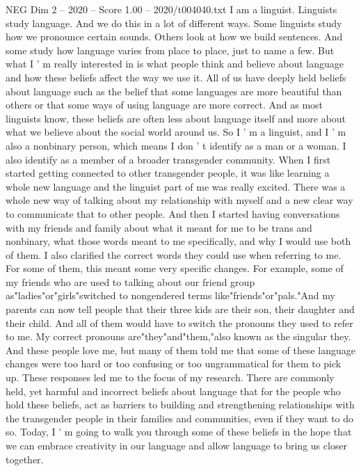 \begin{textsample}{NEG Dim 2 – 2020 – Score 1.00 – 2020/t004040.txt}  \label{ex:f2_neg_080}
I am a linguist.
Linguists study language.
And we do this in a lot of different ways.
Some linguists study how we pronounce certain sounds.
Others look at how we build sentences.
And some study how language varies from place to place, just to name a few.
But what I ' m really interested in is what people think and believe about language and how these beliefs affect the way we use it.
All of us have deeply held beliefs about language such as the belief that some languages are more beautiful than others or that some ways of using language are more correct.
And as most linguists know, these beliefs are often less about language itself and more about what we believe about the social world around us.
So I ' m a linguist, and I ' m also a nonbinary person, which means I don ' t identify as a man or a woman.
I also identify as a member of a broader transgender community.
When I first started getting connected to other transgender people, it was like learning a whole new language and the linguist part of me was really excited.
There was a whole new way of talking about my relationship with myself and a new clear way to communicate that to other people.
And then I started having conversations with my friends and family about what it meant for me to be trans and nonbinary, what those words meant to me specifically, and why I would use both of them.
I also clarified the correct words they could use when referring to me.
For some of them, this meant some very specific changes.
For example, some of my friends who are used to talking about our friend group as"ladies"or"girls"switched to nongendered terms like"friends"or"pals."And my parents can now tell people that their three kids are their son, their daughter and their child.
And all of them would have to switch the pronouns they used to refer to me.
My correct pronouns are"they"and"them,"also known as the singular they.
And these people love me, but many of them told me that some of these language changes were too hard or too confusing or too ungrammatical for them to pick up.
These responses led me to the focus of my research.
There are commonly held, yet harmful and incorrect beliefs about language that for the people who hold these beliefs, act as barriers to building and strengthening relationships with the transgender people in their families and communities, even if they want to do so.
Today, I ' m going to walk you through some of these beliefs in the hope that we can embrace creativity in our language and allow language to bring us closer together.

\end{textsample}
